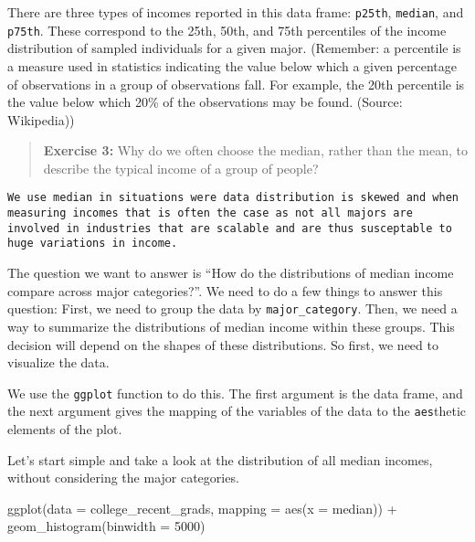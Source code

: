 \documentclass[
]{article}
\newenvironment{Shaded}{\begin{snugshade}}{\end{snugshade}}
\newcommand{\AttributeTok}[1]{\textcolor[rgb]{0.77,0.63,0.00}{#1}}
\newcommand{\DecValTok}[1]{\textcolor[rgb]{0.00,0.00,0.81}{#1}}
\newcommand{\FunctionTok}[1]{\textcolor[rgb]{0.00,0.00,0.00}{#1}}
\newcommand{\NormalTok}[1]{#1}
\newcommand{\SpecialCharTok}[1]{\textcolor[rgb]{0.00,0.00,0.00}{#1}}
\begin{document}
There are three types of incomes reported in this data frame:
\texttt{p25th}, \texttt{median}, and \texttt{p75th}. These correspond to
the 25th, 50th, and 75th percentiles of the income distribution of
sampled individuals for a given major. (Remember: a percentile is a
measure used in statistics indicating the value below which a given
percentage of observations in a group of observations fall. For example,
the 20th percentile is the value below which 20\% of the observations
may be found. (Source: Wikipedia))

\begin{quote}
\textbf{Exercise 3:} Why do we often choose the median, rather than the
mean, to describe the typical income of a group of people?
\end{quote}

\begin{verbatim}
We use median in situations were data distribution is skewed and when measuring incomes that is often the case as not all majors are involved in industries that are scalable and are thus susceptable to huge variations in income.
\end{verbatim}

The question we want to answer is ``How do the distributions of median
income compare across major categories?''. We need to do a few things to
answer this question: First, we need to group the data by
\texttt{major\_category}. Then, we need a way to summarize the
distributions of median income within these groups. This decision will
depend on the shapes of these distributions. So first, we need to
visualize the data.

We use the \texttt{ggplot} function to do this. The first argument is
the data frame, and the next argument gives the mapping of the variables
of the data to the \texttt{aes}thetic elements of the plot.

Let's start simple and take a look at the distribution of all median
incomes, without considering the major categories.

\begin{Shaded}
\begin{Highlighting}[]
\FunctionTok{ggplot}\NormalTok{(}\AttributeTok{data =}\NormalTok{ college\_recent\_grads, }\AttributeTok{mapping =} \FunctionTok{aes}\NormalTok{(}\AttributeTok{x =}\NormalTok{ median)) }\SpecialCharTok{+}
  \FunctionTok{geom\_histogram}\NormalTok{(}\AttributeTok{binwidth =} \DecValTok{5000}\NormalTok{)}
\end{Highlighting}
\end{Shaded}
\end{document}
